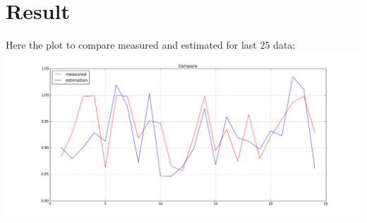 \documentclass{article}
\begin{document}
\newpage

\section{Result}
Here the plot to compare measured and estimated for last 25 data:\\
\includegraphics[width=500pt]{komparasi}\\
\end{document}
